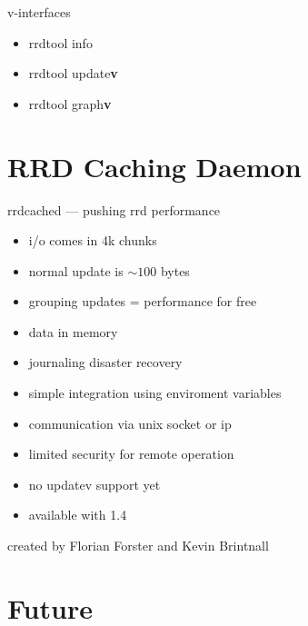 
\begin{frame}{v-interfaces}
\begin{itemize}[<+-| alert@+>]
\item rrdtool info
\item rrdtool update\textbf{v}
\item rrdtool graph\textbf{v}
\end{itemize}
\end{frame}


\section{RRD Caching Daemon}

\begin{frame}{rrdcached --- pushing rrd performance}
\begin{itemize}[<+-| alert@+>]
\item i/o comes in 4k chunks
\item normal update is $\sim{}100$ bytes
\item grouping updates = performance for free
\item data in memory
\item journaling disaster recovery
\item simple integration using enviroment variables
\item communication via unix socket or ip
\item limited security for remote operation
\item no updatev support yet
\item available with 1.4
\end{itemize}
created by Florian Forster and Kevin Brintnall
\end{frame}

\section{Future}

